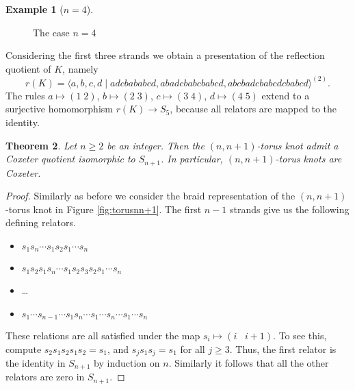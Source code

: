\documentclass{article}
\newtheorem{theorem}{Theorem}[section]
\theoremstyle{definition}
\newtheorem{example}[theorem]{Example}
\begin{document}
\begin{example}[$n=4$]
\begin{figure}[ht]
\caption{The case $n = 4$}
\label{fig:torus45}
\end{figure}

Considering the first three strands we obtain a presentation of the reflection quotient of $K$, namely
$$r(K) = \langle a, b, c, d \; | \; adcbababcd, abadcbabcbabcd, abcbadcbabcdcbabcd \rangle^{(2)}.$$
The rules $a \mapsto (1 \; 2)$, $b \mapsto (2 \; 3)$, $c \mapsto (3 \; 4)$, $d \mapsto (4 \; 5)$ extend to a surjective homomorphism $r(K) \rightarrow S_5$, because all relators are mapped to the identity.
\end{example}

\begin{theorem}
Let $n \geq 2$ be an integer. Then the $(n, n+1)$-torus knot admit a Coxeter quotient isomorphic to $S_{n+1}$. In particular, $(n, n+1)$-torus knots are Coxeter.
\end{theorem}

\begin{proof} Similarly as before we consider the braid representation of the $(n, n+1)$-torus knot in Figure \ref{fig:torusnn+1}. The first $n-1$ strands give us the following defining relators.
\begin{itemize}
\setlength\itemsep{0em}
\item $s_1 s_n \cdots s_1 s_2 s_1 \cdots s_n$
\item $s_1s_2s_1 s_n \cdots s_1 s_2 s_3 s_2 s_1 \cdots s_n$
\item \dots
\item $s_1 \cdots s_{n-1} \cdots s_1 s_n \cdots s_1 \cdots s_n \cdots s_1 \cdots s_n$
\end{itemize}
These relations are all satisfied under the map $s_i \mapsto (i \;\;\; i+1)$. To see this, compute $s_2s_1s_2s_1s_2 = s_1$,
and $s_js_1s_j = s_1$ for all $j \geq 3$. Thus, the first relator is the identity in $S_{n+1}$ by induction on $n$. Similarly it follows that all the other relators are zero in $S_{n+1}$.
\end{proof}
\end{document}
